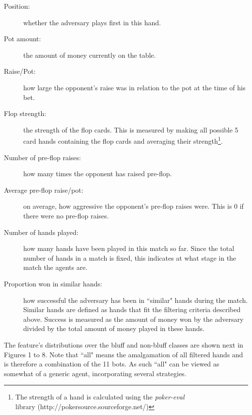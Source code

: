 \documentclass[letterpaper]{article}
\begin{document}
\begin{description}
  \item[Position:] whether the adversary plays first in this hand.
  \item[Pot amount:] the amount of money currently on the table.
  \item[Raise/Pot:] how large the opponent's raise was in relation to the pot at the time of his bet.
  \item[Flop strength:] the strength of the flop cards. This is measured by making all possible 5 card hands containing the flop cards and averaging their strength\footnote{The strength of a hand is calculated using the \emph{poker-eval}\\ library (http://pokersource.sourceforge.net/)}.
  \item[Number of pre-flop raises:] how many times the opponent has raised pre-flop.
  \item[Average pre-flop raise/pot:] on average, how aggressive the opponent's pre-flop raises were. This is 0 if there were no pre-flop raises.
  \item[Number of hands played:] how many hands have been played in this match so far. Since the total number of hands in a match is fixed, this indicates at what stage in the match the agents are.
  \item[Proportion won in similar hands:] how successful the adversary has been in ``similar" hands during the match. Similar hands are defined as hands that fit the filtering criteria described above. Success is measured as the amount of money won by the adversary divided by the total amount of money played in these hands. 
\end{description}

The feature's distributions over the bluff and non-bluff classes are shown next in Figures 1 to 8. Note that ``all" means the amalgamation of all filtered hands and is therefore a combination of the 11 bots. As such ``all" can be viewed as somewhat of a generic agent, incorporating several strategies.
\end{document}
